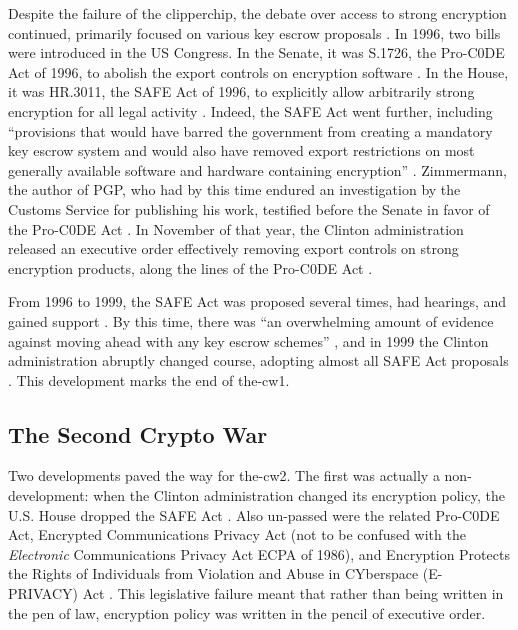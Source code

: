 Despite the failure of the \ac{clipperchip}, the debate over access to strong encryption continued, primarily focused on
various key escrow proposals \cite{thompson_2015}. In 1996, two bills were introduced in the US Congress. In the Senate,
it was S.1726, the Pro-C0DE Act of 1996, to abolish the export controls on encryption software \cite{burns_s1726_1996}.
In the House, it was HR.3011, the SAFE Act of 1996, to explicitly allow arbitrarily strong encryption for all legal
activity \cite{goodlatte_hr3011_1996}. Indeed, the SAFE Act went further, including ``provisions that would have barred
the government from creating a mandatory key escrow system and would also have removed export restrictions on most
generally available software and hardware containing encryption'' \cite{kehl_right_2015}. Zimmermann, the author of PGP,
who had by this time endured an investigation by the Customs Service for publishing his work, testified before the
Senate in favor of the Pro-C0DE Act \cite{zimmermann_1996}. In November of that year, the Clinton administration
released an executive order effectively removing export controls on strong encryption products, along the lines of the
Pro-C0DE Act \cite{clinton_1996}.

From 1996 to 1999, the SAFE Act was proposed several times, had hearings, and gained support \cite{kehl_right_2015}. By
this time, there was ``an overwhelming amount of evidence against moving ahead with any key escrow schemes''
\cite{thompson_2015}, and in 1999 the Clinton administration abruptly changed course, adopting almost all SAFE Act
proposals \cite{kehl_right_2015}. This development marks the end of \ac{the-cw1}.

\subsection{The Second Crypto War}
\label{sec-history-cw2}

Two developments paved the way for \ac{the-cw2}. The first was actually a non-development: when the Clinton
administration changed its encryption policy, the U.S. House dropped the SAFE Act \cite{kehl_right_2015}. Also un-passed
were the related Pro-C0DE Act, Encrypted Communications Privacy Act (not to be confused with the \textit{Electronic}
Communications Privacy Act \acs{ECPA} of 1986), and Encryption Protects the Rights of Individuals from Violation and
Abuse in CYberspace (E-PRIVACY) Act \cite{leahy_s376_1997} \cite{ashcroft_s2067_1998}. This legislative failure meant
that rather than being written in the pen of law, encryption policy was written in the pencil of executive order.

